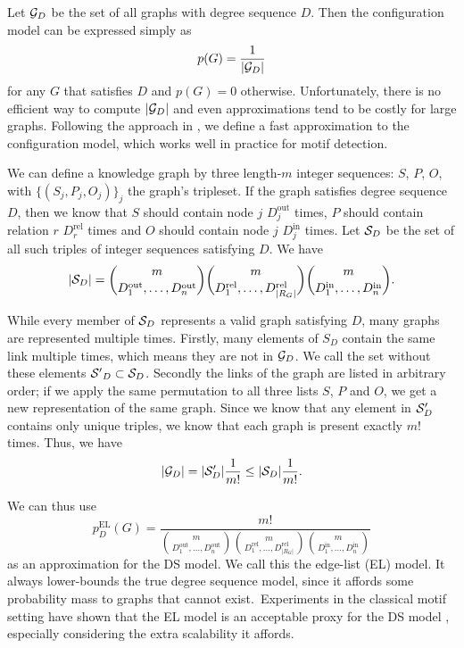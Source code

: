 \documentclass[11pt]{article}
\newcommand{\G}{{\cal G}}
\begin{document}
Let $\G_D$ be the set of all graphs with degree sequence $D$. Then the configuration model can be expressed simply as
\[
p(G) = \frac{1}{|\G_D|}
\]
for any $G$ that satisfies $D$ and $p(G) = 0$ otherwise. Unfortunately, there is no efficient way to compute $|\G_D|$ and even approximations tend to be costly for large graphs. Following the approach in \cite{bloem2017large}, we define a fast approximation to the configuration model, which works well in practice for motif detection. 

We can define a knowledge graph by three length-$m$ integer sequences: $S$, $P$, $O$, with $\{(S_j, P_j, O_j)\}_j$ the graph's tripleset. If the graph satisfies degree sequence $D$, then we know that $S$ should contain node $j$ $D^\text{out}_j$ times, $P$ should contain relation $r$ $D^\text{rel}_r$ times and $O$ should contain node $j$ $D^\text{in}_j$ times.  Let ${\cal S}_D$ be the set of all such triples of integer sequences satisfying $D$. We have 
\[
|{\cal S}_D| =
 {m \choose {D_1^\text{out}, \ldots, D_n^\text{out}} }
 {m \choose {D_1^\text{rel}, \ldots, D_{|R_G|}^\text{rel}} }
 {m \choose {D_1^\text{in}, \ldots, D_n^\text{in}} } \text{.}
\]

While every member of ${\cal S}_D$ represents a valid graph satisfying $D$, many graphs are represented multiple times. Firstly, many elements of ${S}_D$ contain the same link multiple times, which means they are not in ${\cal G}_D$. We call the set without these elements ${\cal S'}_D \subset {\cal S}_D$. Secondly the links of the graph are listed in arbitrary order; if we apply the same permutation to all three lists $S$, $P$ and $O$, we get a new representation of the same graph. Since we know that any element in ${\cal S}'_D$ contains only unique triples, we know that each graph is present exactly $m!$ times. Thus, we have
\[
|\G_D| = |{\cal S}'_D| \frac{1}{m!} \leq  |{\cal S}_D| \frac{1}{m!} \text{.}
\]

We can thus use 
\[
p^\text{EL}_D(G) =  \frac{m!}{{m \choose {D_1^\text{out}, \ldots, D_n^\text{out}} }
 {m \choose {D_1^\text{rel}, \ldots, D_{|R_G|}^\text{rel}} }
 {m \choose {D_1^\text{in}, \ldots, D_n^\text{in}} }}
\]
as an approximation for the DS model. We call this the edge-list (EL) model. It always lower-bounds the true degree sequence model, since it affords some probability mass to graphs that cannot exist.\footnotemark ~Experiments in the classical motif setting have shown that the EL model is an acceptable proxy for the DS model \cite{bloem2017large}, especially considering the extra scalability it affords.
\end{document}

